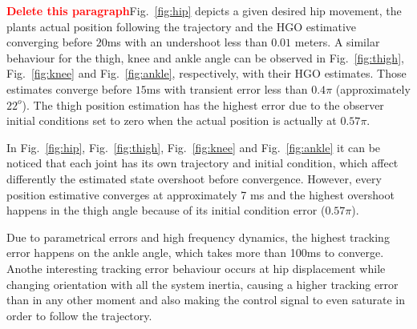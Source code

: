 \documentclass[letterpaper, 10 pt, journal, twocolumn]{IEEEtran}  %
\theoremstyle{plain}
\theoremstyle{definition}
\theoremstyle{remark}
\begin{document}
\textcolor{red}{\textbf{Delete this paragraph}}Fig.~\ref{fig:hip} depicts a given desired hip movement, the plants actual position following the trajectory and the HGO estimative converging before $20$ms with an undershoot less than $0.01$ meters. A similar behaviour for the thigh, knee and ankle angle can be observed in Fig.~\ref{fig:thigh}, Fig.~\ref{fig:knee} and Fig.~\ref{fig:ankle}, respectively, with their HGO estimates. Those estimates converge before $15$ms with transient error less than $0.4\pi$ (approximately  $22^o$). The thigh position estimation has the highest error due to the observer initial conditions set to zero when the actual position is actually at $0.57\pi$.

In Fig.~\ref{fig:hip}, Fig.~\ref{fig:thigh}, Fig.~\ref{fig:knee} and Fig.~\ref{fig:ankle} it can be noticed that each joint has its own trajectory and initial condition, which affect differently the estimated state overshoot before convergence. However, every position estimative converges at approximately 7 ms and the highest overshoot happens in the thigh angle because of its initial condition error ($0.57\pi$).

Due to parametrical errors and high frequency dynamics, the highest tracking error happens on the ankle angle, which takes more than 100ms to converge. Anothe interesting tracking error behaviour occurs at hip displacement while changing orientation with all the system inertia, causing a higher tracking error than in any other moment and also making the control signal to even saturate in order to follow the trajectory.  
\end{document}
